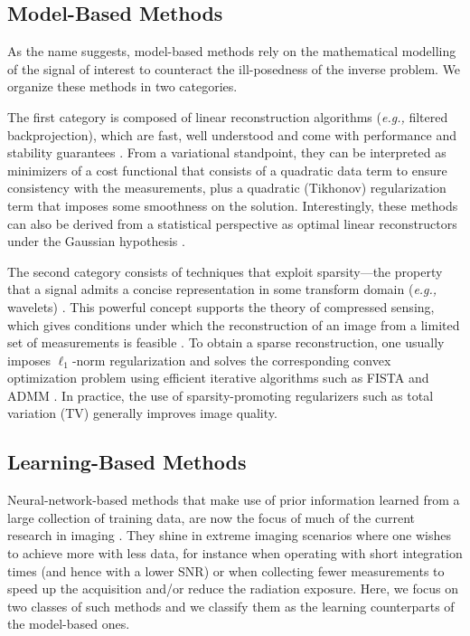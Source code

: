 \documentclass[journal]{IEEEtran}
\begin{document}
\subsection{Model-Based Methods}
As the name suggests, model-based methods rely on the mathematical modelling of the signal of interest to counteract the ill-posedness of the inverse problem. We organize these methods in two categories. 

The first category is composed of linear reconstruction algorithms (\textit{e.g.,} filtered backprojection), which are fast, well understood and come with performance and stability guarantees \cite{tikhonov1963, bertero1998}. From a variational standpoint, they can be interpreted as minimizers of a cost functional that consists of a quadratic data term to ensure consistency with the measurements, plus a quadratic (Tikhonov) regularization term that imposes some smoothness on the solution. Interestingly, these methods can also be derived from a statistical perspective as optimal linear reconstructors under the Gaussian hypothesis \cite{kay1993fundamentals}. 

The second category consists of techniques that exploit sparsity---the property that a signal admits a concise representation in some transform domain (\textit{e.g.,} wavelets) \cite{mallat1999wavelet, bruckstein2009sparse,baraniuk2010applications,elad2010sparse}. This powerful concept supports the theory of compressed sensing, which gives conditions under which the reconstruction of an image from a limited set of measurements is feasible \cite{donoho2006compressed,candes2008introduction,foucart2013invitation}. To obtain a sparse reconstruction, one usually imposes $\ell_1$-norm regularization and solves the corresponding convex optimization problem using efficient iterative algorithms such as FISTA \cite{beck2009fast} and ADMM \cite{boyd2011distributed}. In practice, the use of sparsity-promoting regularizers such as total variation (TV) \cite{rudin1992nonlinear} generally improves image quality.

\subsection{Learning-Based Methods}
Neural-network-based methods that make use of prior information learned from a large collection of training data, are now the focus of much of the current research in imaging \cite{mccann2017convolutional,ongie2020deep}. They shine in extreme imaging scenarios where one wishes to achieve more with less data, for instance when operating with short integration times (and hence with a lower SNR) or when collecting fewer measurements to speed up the acquisition and/or reduce the radiation exposure. Here, we focus on two classes of such methods and we classify them as the learning counterparts of the model-based ones.
\end{document}
